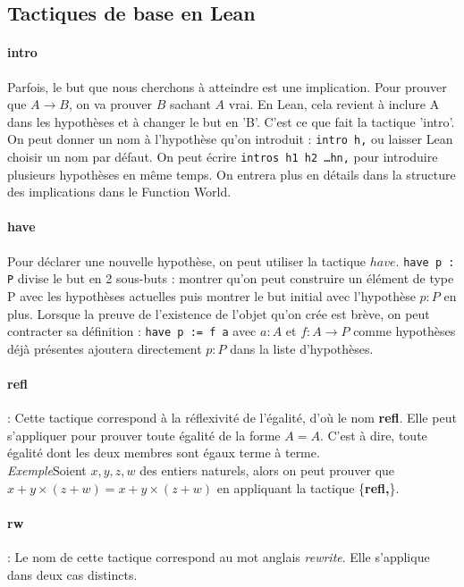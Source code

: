 \subsection{Tactiques de base en Lean}


\paragraph{intro}

Parfois, le but que nous cherchons à atteindre est une implication. Pour prouver que $A \to B$, on va prouver $B$ sachant $A$ vrai. En Lean, cela revient à inclure A dans les hypothèses et à changer le but en 'B'. C'est ce que fait la tactique 'intro'. On peut donner un nom à l'hypothèse qu'on introduit : \texttt{intro h,} ou laisser Lean choisir un nom par défaut.
On peut écrire \texttt{intros h1 h2 \ldots hn,} pour introduire plusieurs hypothèses en même temps.
On entrera plus en détails dans la structure des implications dans le Function World.

\paragraph{have}

Pour déclarer une nouvelle hypothèse, on peut utiliser la tactique $have$.
\texttt{have p : P} divise le but en 2 sous-buts : montrer qu'on peut construire un élément de type P avec les hypothèses actuelles puis montrer le but initial avec l'hypothèse $p : P$ en plus.
Lorsque la preuve de l'existence de l'objet qu'on crée est brève, on peut contracter sa définition :
\texttt{have p := f a} avec $a : A$ et $f : A \to P$ comme hypothèses déjà présentes ajoutera directement $p : P$ dans la liste d'hypothèses.  


\paragraph {refl}: Cette tactique correspond à la réflexivité de l'égalité, d'où le nom \textbf{refl}. Elle peut s'appliquer pour prouver toute égalité de la forme $A=A$. C'est à dire, toute égalité dont les deux membres sont égaux terme à terme. \\
\textit{Exemple}Soient $x,y,z,w$ des entiers naturels, alors on peut prouver que $x+y \times (z+w)=x+y \times (z+w)$ en appliquant la tactique \big\{\textbf{refl,}\big\}.
\paragraph {\large\textbf{rw}}: Le nom de cette tactique correspond au mot anglais \textit{rewrite}. Elle s'applique dans deux cas distincts.

